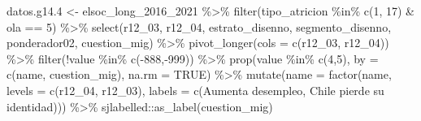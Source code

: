 \documentclass[
  12pt,
]{book}
\newenvironment{Shaded}{\begin{snugshade}}{\end{snugshade}}
\newcommand{\AttributeTok}[1]{\textcolor[rgb]{0.77,0.63,0.00}{#1}}
\newcommand{\ConstantTok}[1]{\textcolor[rgb]{0.00,0.00,0.00}{#1}}
\newcommand{\DecValTok}[1]{\textcolor[rgb]{0.00,0.00,0.81}{#1}}
\newcommand{\FloatTok}[1]{\textcolor[rgb]{0.00,0.00,0.81}{#1}}
\newcommand{\FunctionTok}[1]{\textcolor[rgb]{0.00,0.00,0.00}{#1}}
\newcommand{\NormalTok}[1]{#1}
\newcommand{\OtherTok}[1]{\textcolor[rgb]{0.56,0.35,0.01}{#1}}
\newcommand{\SpecialCharTok}[1]{\textcolor[rgb]{0.00,0.00,0.00}{#1}}
\newcommand{\StringTok}[1]{\textcolor[rgb]{0.31,0.60,0.02}{#1}}
\begin{document}
\begin{Shaded}
\begin{Highlighting}[]
\NormalTok{datos.g14}\FloatTok{.4} \OtherTok{\textless{}{-}}\NormalTok{ elsoc\_long\_2016\_2021 }\SpecialCharTok{\%\textgreater{}\%}
  \FunctionTok{filter}\NormalTok{(tipo\_atricion }\SpecialCharTok{\%in\%} \FunctionTok{c}\NormalTok{(}\DecValTok{1}\NormalTok{, }\DecValTok{17}\NormalTok{) }\SpecialCharTok{\&}\NormalTok{ ola }\SpecialCharTok{==} \DecValTok{5}\NormalTok{) }\SpecialCharTok{\%\textgreater{}\%} 
  \FunctionTok{select}\NormalTok{(r12\_03, r12\_04, estrato\_disenno, segmento\_disenno, ponderador02, cuestion\_mig) }\SpecialCharTok{\%\textgreater{}\%}
  \FunctionTok{pivot\_longer}\NormalTok{(}\AttributeTok{cols =} \FunctionTok{c}\NormalTok{(r12\_03, r12\_04)) }\SpecialCharTok{\%\textgreater{}\%} 
  \FunctionTok{filter}\NormalTok{(}\SpecialCharTok{!}\NormalTok{value }\SpecialCharTok{\%in\%} \FunctionTok{c}\NormalTok{(}\SpecialCharTok{{-}}\DecValTok{888}\NormalTok{,}\SpecialCharTok{{-}}\DecValTok{999}\NormalTok{)) }\SpecialCharTok{\%\textgreater{}\%} 
  \FunctionTok{prop}\NormalTok{(value }\SpecialCharTok{\%in\%} \FunctionTok{c}\NormalTok{(}\DecValTok{4}\NormalTok{,}\DecValTok{5}\NormalTok{), }\AttributeTok{by =} \FunctionTok{c}\NormalTok{(name, cuestion\_mig), }\AttributeTok{na.rm =} \ConstantTok{TRUE}\NormalTok{) }\SpecialCharTok{\%\textgreater{}\%} 
  \FunctionTok{mutate}\NormalTok{(}\AttributeTok{name =} \FunctionTok{factor}\NormalTok{(name, }\AttributeTok{levels =} \FunctionTok{c}\NormalTok{(}\StringTok{\textquotesingle{}r12\_04\textquotesingle{}}\NormalTok{, }\StringTok{\textquotesingle{}r12\_03\textquotesingle{}}\NormalTok{), }
                       \AttributeTok{labels =} \FunctionTok{c}\NormalTok{(}\StringTok{\textquotesingle{}Aumenta desempleo\textquotesingle{}}\NormalTok{, }\StringTok{\textquotesingle{}Chile pierde su identidad\textquotesingle{}}\NormalTok{))) }\SpecialCharTok{\%\textgreater{}\%} 
\NormalTok{  sjlabelled}\SpecialCharTok{::}\FunctionTok{as\_label}\NormalTok{(cuestion\_mig)}


\end{Highlighting}
\end{Shaded}
\end{document}
